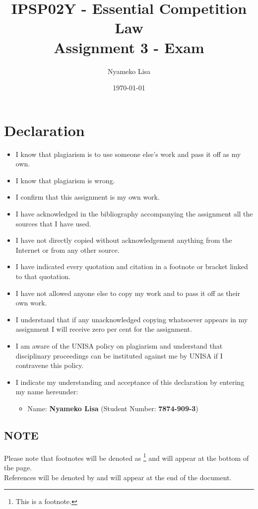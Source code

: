 \documentclass[11pt]{article}
\author{Nyameko Lisa}
\date{\today}
\title{IPSP02Y - Essential Competition Law\\\medskip
\large Assignment 3 - Exam}
\begin{document}
\maketitle
\section*{Declaration}
\label{sec:orge17480c}
\begin{itemize}
\item I know that plagiarism is to use someone else’s work and pass it off as my own.
\item I know that plagiarism is wrong.
\item I confirm that this assignment is my own work.
\item I have acknowledged in the bibliography accompanying the assignment all the sources that I have used.
\item I have not directly copied without acknowledgement anything from the Internet or from any other source.
\item I have indicated every quotation and citation in a footnote or bracket linked to that quotation.
\item I have not allowed anyone else to copy my work and to pass it off as their own work.
\item I understand that if any unacknowledged copying whatsoever appears in my assignment I will receive zero per cent for the assignment.
\item I am aware of the UNISA policy on plagiarism and understand that disciplinary proceedings can be instituted against me by UNISA if I contravene this policy.
\item I indicate my understanding and acceptance of this declaration by
entering my name hereunder:
\begin{itemize}
\item Name: \textbf{Nyameko Lisa} (Student Number: \textbf{7874-909-3})
\end{itemize}
\end{itemize}

\subsection*{NOTE}
\label{sec:org4b8cc11}
Please note that footnotes will be denoted as \footnote{This is a footnote.} and will
appear at the bottom of the page.\\
References will be denoted by \cite{wipo83_paris_conve_protect_ip} and will appear at the end of the document.
\newpage
\end{document}
